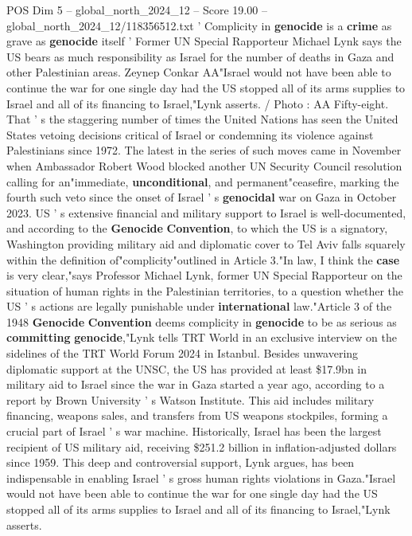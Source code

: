 \begin{textsample}{POS Dim 5 – global\_north\_2024\_12 – Score 19.00 – global\_north\_2024\_12/118356512.txt}  \label{ex:f5_pos_098}
' Complicity in \textbf{genocide} is a \textbf{crime} as grave as \textbf{genocide} itself ' Former UN Special Rapporteur Michael Lynk says the US bears as much responsibility as Israel for the number of deaths in Gaza and other Palestinian areas.
Zeynep Conkar AA"Israel would not have been able to continue the war for one single day had the US stopped all of its arms supplies to Israel and all of its financing to Israel,"Lynk asserts. / Photo : AA Fifty-eight.
That ' s the staggering number of times the United Nations has seen the United States vetoing decisions critical of Israel or condemning its violence against Palestinians since 1972.
The latest in the series of such moves came in November when Ambassador Robert Wood blocked another UN Security Council resolution calling for an"immediate, \textbf{unconditional}, and permanent"ceasefire, marking the fourth such veto since the onset of Israel ' s \textbf{genocidal} war on Gaza in October 2023.
US ' s extensive financial and military support to Israel is well-documented, and according to the \textbf{Genocide} \textbf{Convention}, to which the US is a signatory, Washington providing military aid and diplomatic cover to Tel Aviv falls squarely within the definition of"complicity"outlined in Article 3."In law, I think the \textbf{case} is very clear,"says Professor Michael Lynk, former UN Special Rapporteur on the situation of human rights in the Palestinian territories, to a question whether the US ' s actions are legally punishable under \textbf{international} law."Article 3 of the 1948 \textbf{Genocide} \textbf{Convention} deems complicity in \textbf{genocide} to be as serious as \textbf{committing} \textbf{genocide},"Lynk tells TRT World in an exclusive interview on the sidelines of the TRT World Forum 2024 in Istanbul.
Besides unwavering diplomatic support at the UNSC, the US has provided at least \$17.9bn in military aid to Israel since the war in Gaza started a year ago, according to a report by Brown University ' s Watson Institute.
This aid includes military financing, weapons sales, and transfers from US weapons stockpiles, forming a crucial part of Israel ' s war machine.
Historically, Israel has been the largest recipient of US military aid, receiving \$251.2 billion in inflation-adjusted dollars since 1959.
This deep and controversial support, Lynk argues, has been indispensable in enabling Israel ' s gross human rights violations in Gaza."Israel would not have been able to continue the war for one single day had the US stopped all of its arms supplies to Israel and all of its financing to Israel,"Lynk asserts.

\end{textsample}
